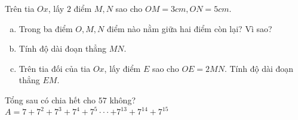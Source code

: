 \begin{ex}
	Trên tia $Ox$, lấy $2$ điểm $M, N$ sao cho $OM = 3cm, ON = 5cm$.
	\begin{enumerate}[a)]
	\item Trong ba điểm $O, M, N$ điểm nào nằm giữa hai điểm còn lại? Vì sao?
\item Tính độ dài đoạn thẳng $MN$.
\item Trên tia đối của tia $Ox$, lấy điểm $E$ sao cho $OE = 2MN$. Tính độ dài đoạn thẳng $EM$.

	\end{enumerate}
\end{ex}
\begin{ex}
	Tổng sau có chia hết cho $57$ không?\\
$A=7+{{7}^{2}}+{{7}^{3}}+{{7}^{4}}+{{7}^{5}}\cdot \cdot \cdot +{{7}^{13}}+{{7}^{14}}+{{7}^{15}}$

\end{ex}